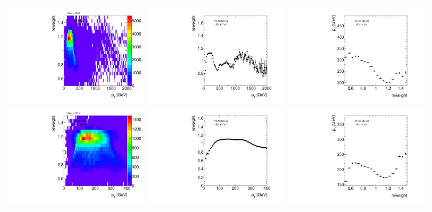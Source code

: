 \begin{figure}[htbp!]
\begin{center}
\includegraphics[width=0.32\textwidth,angle=-90]{figures/boosted/AppendixReweight/Weights/2Trk_split_Sideband_leadHCand_trk0_Pt_weight.pdf}
\includegraphics[width=0.32\textwidth,angle=-90]{figures/boosted/AppendixReweight/Weights/2Trk_split_Sideband_leadHCand_trk0_Pt_weight_profx.pdf}
\includegraphics[width=0.32\textwidth,angle=-90]{figures/boosted/AppendixReweight/Weights/2Trk_split_Sideband_leadHCand_trk0_Pt_weight_profy.pdf}\\
\includegraphics[width=0.32\textwidth,angle=-90]{figures/boosted/AppendixReweight/Weights/2Trk_split_Sideband_sublHCand_trk0_Pt_weight.pdf}
\includegraphics[width=0.32\textwidth,angle=-90]{figures/boosted/AppendixReweight/Weights/2Trk_split_Sideband_sublHCand_trk0_Pt_weight_profx.pdf}
\includegraphics[width=0.32\textwidth,angle=-90]{figures/boosted/AppendixReweight/Weights/2Trk_split_Sideband_sublHCand_trk0_Pt_weight_profy.pdf}\\

\end{center}
\end{figure}
